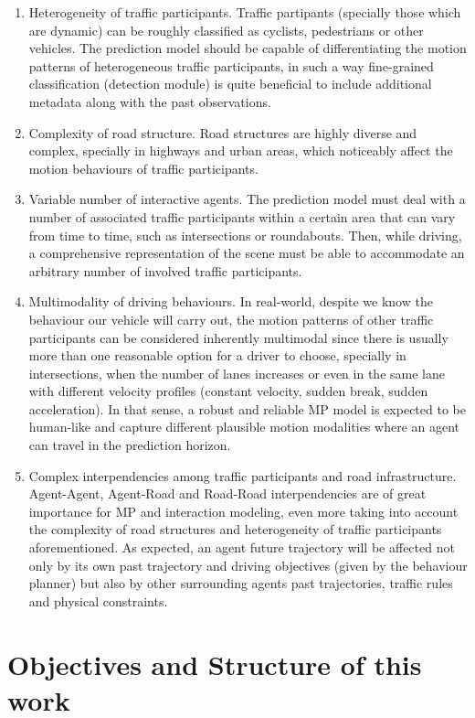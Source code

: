 \begin{enumerate}
	\item Heterogeneity of traffic participants. Traffic partipants (specially those which are dynamic) can be roughly classified as cyclists, pedestrians or other vehicles. The prediction model should be capable of differentiating the motion patterns of heterogeneous traffic participants, in such a way fine-grained classification (detection module) is quite beneficial to include additional metadata along with the past observations.
	\item Complexity of road structure. Road structures are highly diverse and complex, specially in highways and urban areas, which noticeably affect the motion behaviours of traffic participants.
	\item Variable number of interactive agents. The prediction model must deal with a number of associated traffic participants within a certain area that can vary from time to time, such as intersections or roundabouts. Then, while driving, a comprehensive representation of the scene must be able to accommodate an arbitrary number of involved traffic participants.
	\item Multimodality of driving behaviours. In real-world, despite we know the behaviour our vehicle will carry out, the motion patterns of other traffic participants can be considered inherently multimodal since there is usually more than one reasonable option for a driver to choose, specially in intersections, when the number of lanes increases or even in the same lane with different velocity profiles (constant velocity, sudden break, sudden acceleration). In that sense, a robust and reliable \ac{MP} model is expected to be human-like and capture different plausible motion modalities where an agent can travel in the prediction horizon.
	\item Complex interpendencies among traffic participants and road infrastructure. Agent-Agent, Agent-Road and Road-Road interpendencies are of great importance for \ac{MP} and interaction modeling, even more taking into account the complexity of road structures and heterogeneity of traffic participants aforementioned. As expected, an agent future trajectory will be affected not only by its own past trajectory and driving objectives (given by the behaviour planner) but also by other surrounding agents past trajectories, traffic rules and physical constraints.
\end{enumerate}

\section{Objectives and Structure of this work}
\label{sec:1_objectives_and_structure}

